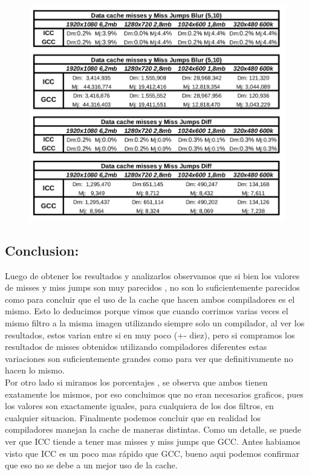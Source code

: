 \begin{figure}[H]
\begin{center}
  \includegraphics[width=\linewidth]{cachecompiladores/tabla.png}
\end{center}
\end{figure}

\subsection{Conclusion:}

Luego de obtener los resultados y analizarlos observamos que si bien los valores de misses y miss jumps son muy parecidos , no son lo suficientemente parecidos como para concluir que el uso de la cache que hacen ambos compiladores es el mismo. Esto lo deducimos porque vimos que cuando corrimos varias veces el mismo filtro a la misma imagen utilizando siempre solo un compilador, al ver los resultados, estos varian entre si en muy poco (+- diez), pero si compramos los resultados de misses obtenidos utilizando compiladores diferentes estas variaciones son suficientemente grandes como para ver que definitivamente no hacen lo mismo. \\

Por otro lado si miramos los porcentajes , se observa que ambos tienen exatamente los mismos, por eso concluimos que no eran necesarios graficos, pues los valores son exactamente iguales, para cualquiera de los dos filtros, en cualquier situacion. Finalmente podemos concluir que en realidad los compiladores manejan la cache de maneras distintas. Como un detalle, se puede ver que ICC tiende a tener mas misses y miss jumps que GCC. Antes habiamos visto que ICC es un poco mas rápido que GCC, bueno aqui podemos confirmar que eso no se debe a un mejor uso de la cache.